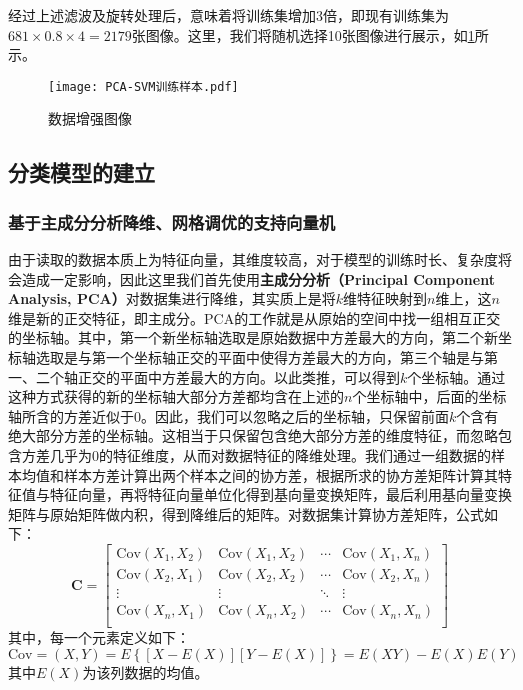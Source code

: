 \documentclass{MathorCupmodeling}
\begin{document}
	经过上述滤波及旋转处理后，意味着将训练集增加3倍，即现有训练集为$681\times 0.8\times 4=2179$张图像。这里，我们将随机选择10张图像进行展示，如\textcolor{blue}{\cref{fig:数据增强}}所示。
	\begin{figure}[H]
		\centering
		\texttt{[image: PCA-SVM训练样本.pdf]}
		\caption{数据增强图像}
		\label{fig:数据增强}
	\end{figure}
	\subsection{分类模型的建立}
	\subsubsection{基于主成分分析降维、网格调优的支持向量机}
	由于读取的数据本质上为特征向量，其维度较高，对于模型的训练时长、复杂度将会造成一定影响，因此这里我们首先使用\textbf{主成分分析（Principal Component Analysis, PCA）}对数据集进行降维，其实质上是将$k$维特征映射到$n$维上，这$n$维是新的正交特征，即主成分。PCA的工作就是从原始的空间中找一组相互正交的坐标轴。其中，第一个新坐标轴选取是原始数据中方差最大的方向，第二个新坐标轴选取是与第一个坐标轴正交的平面中使得方差最大的方向，第三个轴是与第一、二个轴正交的平面中方差最大的方向。以此类推，可以得到$k$个坐标轴。通过这种方式获得的新的坐标轴大部分方差都均含在上述的$n$个坐标轴中，后面的坐标轴所含的方差近似于$0$。因此，我们可以忽略之后的坐标轴，只保留前面$k$个含有绝大部分方差的坐标轴。这相当于只保留包含绝大部分方差的维度特征，而忽略包含方差几乎为$0$的特征维度，从而对数据特征的降维处理。我们通过一组数据的样本均值和样本方差计算出两个样本之间的协方差，根据所求的协方差矩阵计算其特征值与特征向量，再将特征向量单位化得到基向量变换矩阵，最后利用基向量变换矩阵与原始矩阵做内积，得到降维后的矩阵。对数据集计算协方差矩阵，公式如下：
	\begin{equation}
		\boldsymbol{C}=\left[ \begin{matrix}
			\text{Cov}\left( X_1,X_2 \right)&		\text{Cov}\left( X_1,X_2 \right)&		\cdots&		\text{Cov}\left( X_1,X_n \right)\\
			\text{Cov}\left( X_2,X_1 \right)&		\text{Cov}\left( X_2,X_2 \right)&		\cdots&		\text{Cov}\left( X_2,X_n \right)\\
			\vdots&		\vdots&		\ddots&		\vdots\\
			\text{Cov}\left( X_n,X_1 \right)&		\text{Cov}\left( X_n,X_2 \right)&		\cdots&		\text{Cov}\left( X_n,X_n \right)\\
		\end{matrix} \right] \label{C}
	\end{equation}
	其中，每一个元素定义如下\textcolor{blue}{\cite{刘建新}}：
	\begin{equation}
		\text{Cov}=\left( X,Y \right)=E\left\{\left[X-E\left(X\right)\right]\left[Y-E\left(X\right)\right]\right\}=E\left(XY\right)-E\left(X\right)E\left(Y\right) \label{Cov}
	\end{equation}
	其中$E\left(X\right)$为该列数据的均值。
\end{document}
